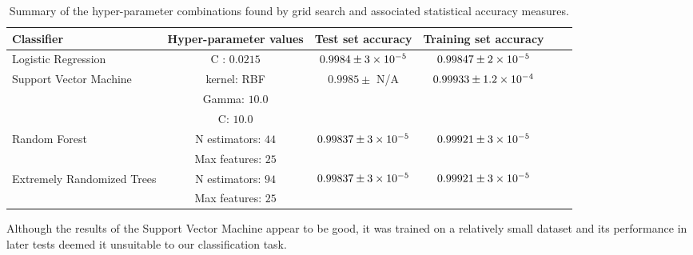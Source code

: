 \begin{table}
    \centering
    \tiny
    \begin{tabular}{p{} c c c c c}
        Classifier                                  & Hyper-parameter values    & Test set accuracy     & Training set accuracy          \\
        \hline
        Logistic Regression                         & C : $0.0215$              & $0.9984 \pm 3\times 10^{-5}$  & $0.99847 \pm 2\times 10^{-5}$ \\
        \multirow{3}{*}{\parbox{0.2\textwidth}{Support Vector Machine}}     & kernel: \ac{RBF}               & \multirow{3}{*}{$0.9985 \pm$ N/A}    & \multirow{3}{*}{$0.99933 \pm 1.2\times 10^{-4}$} \\
                                                    & Gamma: $10.0$             &                           &                               &                               &       \\
                                                    & C: $10.0$                 &                           &                               &                               &       \\
        \multirow{2}{*}{\parbox{0.2\textwidth}{Random Forest}}              & N estimators: $44$        & \multirow{2}{*}{$0.99837 \pm 3\times 10^{-5}$} & \multirow{2}{*}{$0.99921 \pm 3\times 10^{-5}$} \\
                                                    & Max features: $25$        &                           &                               &                               &       \\
        \multirow{2}{*}{\parbox{0.2\textwidth}{Extremely Randomized Trees}} & N estimators: $94$        & \multirow{2}{*}{$0.99837 \pm 3\times 10^{-5}$} & \multirow{2}{*}{$0.99921 \pm 3\times 10^{-5}$} \\
                                                    & Max features: $25$        &                           &                               &                               &       \\
    \end{tabular}
    \caption{Summary of the hyper-parameter combinations found by grid search and associated statistical accuracy measures.}
    \label{tab:gridresults}
\end{table}

Although the results of the Support Vector Machine appear to be good, it was trained on a relatively small dataset and its performance in later tests deemed it unsuitable to our classification task.

